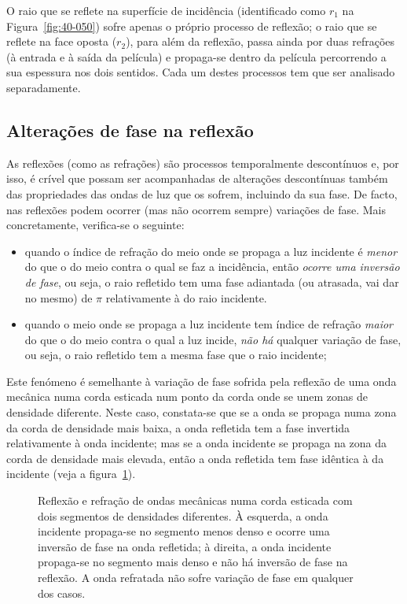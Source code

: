 O raio que se reflete na superfície de incidência (identificado como $r_1$ na
Figura~\ref{fig:40-050}) sofre apenas o próprio processo de reflexão; o raio que
se reflete na face oposta ($r_2$), para além da reflexão, passa ainda por duas
refrações (à entrada e à saída da película) e propaga-se dentro da película
percorrendo a sua espessura nos dois sentidos. Cada um destes processos tem que
ser analisado separadamente.

\subsection*{Alterações de fase na reflexão}
As reflexões (como as refrações) são processos temporalmente descontínuos e,
por isso, é crível que possam ser acompanhadas de alterações descontínuas também
das propriedades das ondas de luz que os sofrem, incluindo da sua fase. De
facto, nas reflexões podem ocorrer (mas não ocorrem sempre) variações de fase.
Mais concretamente, verifica-se o seguinte:
\begin{itemize}
\item
    quando o índice de refração do meio onde se propaga a luz incidente é
    \emph{menor} do que o do meio contra o qual se faz a incidência, então
    \emph{ocorre uma inversão de fase}, ou seja, o raio refletido tem uma fase
    adiantada (ou atrasada, vai dar no mesmo) de $\pi$ relativamente à do raio
    incidente.
\item
    quando o meio onde se propaga a luz incidente tem índice de refração
    \emph{maior} do que o do meio contra o qual a luz incide, \emph{não há}
    qualquer variação de fase, ou seja, o raio refletido tem a mesma fase que o
    raio incidente;
\end{itemize}

Este fenómeno é semelhante à variação de fase sofrida pela reflexão de uma onda
mecânica numa corda esticada num ponto da corda onde se unem zonas de densidade
diferente. Neste caso, constata-se que se a onda se propaga numa zona da corda
de densidade mais baixa, a onda refletida tem a fase invertida relativamente à
onda incidente; mas se a onda incidente se propaga na zona da corda de densidade
mais elevada, então a onda refletida tem fase idêntica à da incidente (veja a
figura~\ref{fig:40-060}).
\begin{figure}[htb]
{\centering

\caption{Reflexão e refração de ondas mecânicas numa corda esticada com dois
segmentos de densidades diferentes. À esquerda, a onda incidente propaga-se no
segmento menos denso e ocorre uma inversão de fase na onda refletida; à direita,
a onda incidente propaga-se no segmento mais denso e não há inversão de fase na
reflexão. A onda refratada não sofre variação de fase em qualquer dos
casos.\label{fig:40-060}}

}
\end{figure}

